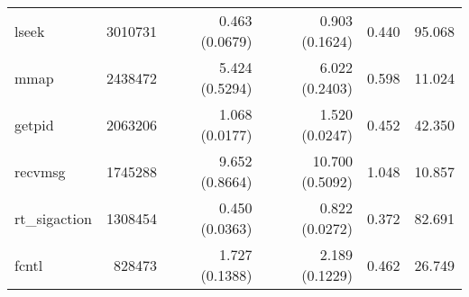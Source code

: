 \begin{tabular}{>{\ttfamily}lrrrrr}
                          lseek &   3010731 &           0.463 (0.0679) &           0.903 (0.1624) &           0.440 &       95.068 \\
                           mmap &   2438472 &           5.424 (0.5294) &           6.022 (0.2403) &           0.598 &       11.024 \\
                         getpid &   2063206 &           1.068 (0.0177) &           1.520 (0.0247) &           0.452 &       42.350 \\
                        recvmsg &   1745288 &           9.652 (0.8664) &          10.700 (0.5092) &           1.048 &       10.857 \\
                  rt\_sigaction &   1308454 &           0.450 (0.0363) &           0.822 (0.0272) &           0.372 &       82.691 \\
                          fcntl &    828473 &           1.727 (0.1388) &           2.189 (0.1229) &           0.462 &       26.749 \\
\bottomrule
\end{tabular}
